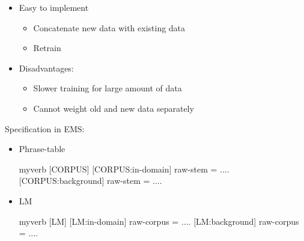 \documentclass[landscape]{uedslides2C}
\begin{document}
\vspace{20mm}
\begin{itemize} \itemsep 10mm
 
\item Easy to implement
  \begin{itemize}
  \item Concatenate new data with existing data
  \item Retrain
  \end{itemize}
\item Disadvantages: 
  \begin{itemize}
  \item Slower training for large amount of data
  \item Cannot weight old and new data separately
  \end{itemize}
\end{itemize}


\vspace{-1mm}
Specification in EMS:
\begin{itemize} \itemsep 5mm
\item Phrase-table\\[4mm] \small
    \begin{SaveVerbatim}{myverb} 
      [CORPUS]
      [CORPUS:in-domain]
      raw-stem = ....    
      [CORPUS:background]
      raw-stem = ....
    \end{SaveVerbatim}
    \colorbox{gray}{}
\item LM\\[4mm] \small
   \begin{SaveVerbatim}{myverb} 
      [LM]
      [LM:in-domain]
      raw-corpus = ....
      [LM:background]
      raw-corpus = ....
    \end{SaveVerbatim}
    \colorbox{gray}{}
\end{itemize}

\end{document}
